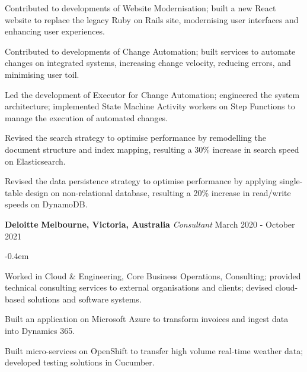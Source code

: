 \documentclass{cv}
\begin{document}
\begin{list}{}{\setlength{\leftmargin}{0em}}
\begin{list}{\raisebox{0.2em}{\tiny$\bullet$} \hspace{0em}}{\setlength{\leftmargin}{2.0em}}
        \item Contributed to developments of Website Modernisation; built a new React website to replace the legacy Ruby on Rails site, modernising user interfaces and enhancing user experiences.
        \item Contributed to developments of Change Automation; built services to automate changes on integrated systems, increasing change velocity, reducing errors, and minimising user toil.
        \item Led the development of Executor for Change Automation; engineered the system architecture; implemented State Machine Activity workers on Step Functions to manage the execution of automated changes.
        \item Revised the search strategy to optimise performance by remodelling the document structure and index mapping, resulting a 30\% increase in search speed on Elasticsearch.
        \item Revised the data persistence strategy to optimise performance by applying single-table design on non-relational database, resulting a 20\% increase in read/write speeds on DynamoDB.
    \end{list}
\item
    \textbf{Deloitte} \hfill \textbf{Melbourne, Victoria, Australia}%
    \vspace{0.1em} \newline 
    {\textit{Consultant}} \hfill {March 2020 - October 2021}%
    \begin{list}{\raisebox{0.2em}{\tiny$\bullet$} \hspace{0em}}{\setlength{\leftmargin}{2.0em}}
        \itemsep -0.4em \vspace{-0.4em}
        \item Worked in Cloud \& Engineering, Core Business Operations, Consulting; provided technical consulting services to external organisations and clients; devised cloud-based solutions and software systems.
        \item Built an application on Microsoft Azure to transform invoices and ingest data into Dynamics 365.
        \item Built micro-services on OpenShift to transfer high volume real-time weather data; developed testing solutions in Cucumber.

\end{list}
\end{list}
\end{document}

